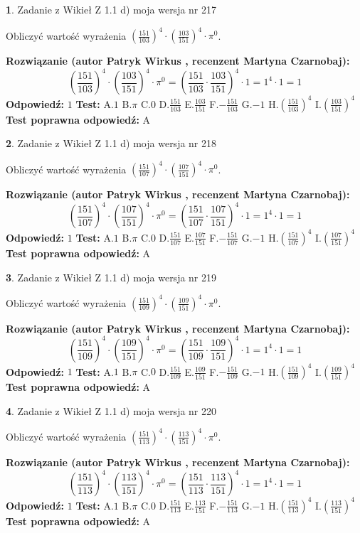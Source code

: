\documentclass[12pt, a4paper]{article}
\theoremstyle{definition} %
\newtheorem{zad}{}
\newcommand{\zadStart}[1]{\begin{zad}#1\newline}
\newcommand{\zadStop}{\end{zad}}
\newcommand{\rozwStart}[2]{\noindent \textbf{Rozwiązanie (autor #1 , recenzent #2): }\newline}
\newcommand{\rozwStop}{\newline}
\newcommand{\odpStart}{\noindent \textbf{Odpowiedź:}\newline}
\newcommand{\odpStop}{\newline}
\newcommand{\testStart}{\noindent \textbf{Test:}\newline}
\newcommand{\testStop}{\newline}
\newcommand{\kluczStart}{\noindent \textbf{Test poprawna odpowiedź:}\newline}
\newcommand{\kluczStop}{\newline}
\begin{document}
\zadStart{Zadanie z Wikieł Z 1.1 d) moja wersja nr 217}

Obliczyć wartość wyrażenia $(\frac{151}{103})^{4} \cdot (\frac{103}{151})^{4} \cdot \pi^{0}$.
\zadStop
\rozwStart{Patryk Wirkus}{Martyna Czarnobaj}
$$(\frac{151}{103})^{4} \cdot (\frac{103}{151})^{4} \cdot \pi^{0} = (\frac{151}{103} \cdot \frac{103}{151})^{4} \cdot 1 = 1^{4} \cdot 1 = 1$$
\rozwStop
\odpStart
$1$
\odpStop
\testStart
A.$1$ B.$\pi$ C.$0$ D.$\frac{151}{103}$ E.$\frac{103}{151}$
F.$-\frac{151}{103}$ G.$-1$
H.$(\frac{151}{103})^{4}$
I.$(\frac{103}{151})^{4}$
\testStop
\kluczStart
A
\kluczStop



\zadStart{Zadanie z Wikieł Z 1.1 d) moja wersja nr 218}

Obliczyć wartość wyrażenia $(\frac{151}{107})^{4} \cdot (\frac{107}{151})^{4} \cdot \pi^{0}$.
\zadStop
\rozwStart{Patryk Wirkus}{Martyna Czarnobaj}
$$(\frac{151}{107})^{4} \cdot (\frac{107}{151})^{4} \cdot \pi^{0} = (\frac{151}{107} \cdot \frac{107}{151})^{4} \cdot 1 = 1^{4} \cdot 1 = 1$$
\rozwStop
\odpStart
$1$
\odpStop
\testStart
A.$1$ B.$\pi$ C.$0$ D.$\frac{151}{107}$ E.$\frac{107}{151}$
F.$-\frac{151}{107}$ G.$-1$
H.$(\frac{151}{107})^{4}$
I.$(\frac{107}{151})^{4}$
\testStop
\kluczStart
A
\kluczStop



\zadStart{Zadanie z Wikieł Z 1.1 d) moja wersja nr 219}

Obliczyć wartość wyrażenia $(\frac{151}{109})^{4} \cdot (\frac{109}{151})^{4} \cdot \pi^{0}$.
\zadStop
\rozwStart{Patryk Wirkus}{Martyna Czarnobaj}
$$(\frac{151}{109})^{4} \cdot (\frac{109}{151})^{4} \cdot \pi^{0} = (\frac{151}{109} \cdot \frac{109}{151})^{4} \cdot 1 = 1^{4} \cdot 1 = 1$$
\rozwStop
\odpStart
$1$
\odpStop
\testStart
A.$1$ B.$\pi$ C.$0$ D.$\frac{151}{109}$ E.$\frac{109}{151}$
F.$-\frac{151}{109}$ G.$-1$
H.$(\frac{151}{109})^{4}$
I.$(\frac{109}{151})^{4}$
\testStop
\kluczStart
A
\kluczStop



\zadStart{Zadanie z Wikieł Z 1.1 d) moja wersja nr 220}

Obliczyć wartość wyrażenia $(\frac{151}{113})^{4} \cdot (\frac{113}{151})^{4} \cdot \pi^{0}$.
\zadStop
\rozwStart{Patryk Wirkus}{Martyna Czarnobaj}
$$(\frac{151}{113})^{4} \cdot (\frac{113}{151})^{4} \cdot \pi^{0} = (\frac{151}{113} \cdot \frac{113}{151})^{4} \cdot 1 = 1^{4} \cdot 1 = 1$$
\rozwStop
\odpStart
$1$
\odpStop
\testStart
A.$1$ B.$\pi$ C.$0$ D.$\frac{151}{113}$ E.$\frac{113}{151}$
F.$-\frac{151}{113}$ G.$-1$
H.$(\frac{151}{113})^{4}$
I.$(\frac{113}{151})^{4}$
\testStop
\kluczStart
A
\kluczStop
\end{document}

